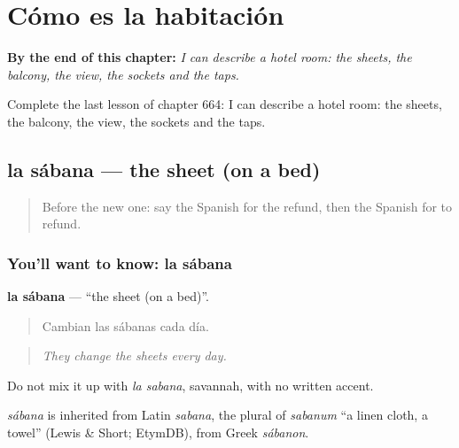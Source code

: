
\chapter{Cómo es la habitación}
\label{ch:es-como-es-la-habitacion}

\begin{chapteropening}
\textbf{By the end of this chapter:} \emph{I can describe a hotel room: the sheets, the balcony, the view, the sockets and the taps.}

Complete the last lesson of chapter 664: I can describe a hotel room: the sheets, the balcony, the view, the sockets and the taps.
\end{chapteropening}

\section[la sábana]{la sábana — the sheet (on a bed)}

\label{lesson:ES-C664-sabana}



\begin{quote}
Before the new one: say the Spanish for the refund, then the Spanish for to refund.
\end{quote}

\subsection*{You'll want to know: la sábana}
\textbf{la sábana} — \textquotedblleft{}the sheet (on a bed)\textquotedblright{}.

\begin{quote}
Cambian las sábanas cada día.
\end{quote}

\begin{quote}
\emph{They change the sheets every day.}
\end{quote}

Do not mix it up with \emph{la sabana}, savannah, with no written accent.

\begin{cousinweb}
\emph{sábana} is inherited from Latin \emph{sabana}, the plural of \emph{sabanum} \textquotedblleft{}a linen cloth, a towel\textquotedblright{} (Lewis \& Short; EtymDB), from Greek \emph{sábanon}.
\end{cousinweb}

